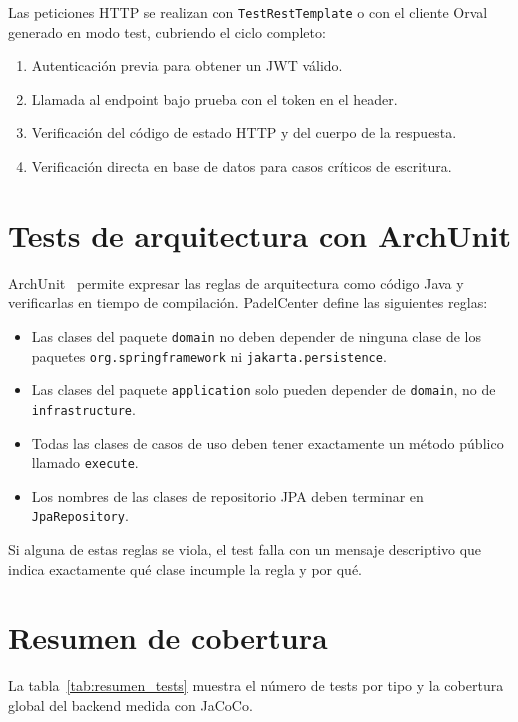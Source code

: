 Las peticiones HTTP se realizan con \texttt{TestRestTemplate} o con el cliente
Orval generado en modo test, cubriendo el ciclo completo:

\begin{enumerate}
  \item Autenticación previa para obtener un JWT válido.
  \item Llamada al endpoint bajo prueba con el token en el header.
  \item Verificación del código de estado HTTP y del cuerpo de la respuesta.
  \item Verificación directa en base de datos para casos críticos de escritura.
\end{enumerate}

\section{Tests de arquitectura con ArchUnit}
\label{sec:tests_arquitectura}

ArchUnit~\cite{archunit} permite expresar las reglas de arquitectura como código Java y
verificarlas en tiempo de compilación. PadelCenter define las siguientes reglas:

\begin{itemize}
  \item Las clases del paquete \texttt{domain} no deben depender de ninguna
    clase de los paquetes \texttt{org.springframework} ni
    \texttt{jakarta.persistence}.
  \item Las clases del paquete \texttt{application} solo pueden depender de
    \texttt{domain}, no de \texttt{infrastructure}.
  \item Todas las clases de casos de uso deben tener exactamente un método
    público llamado \texttt{execute}.
  \item Los nombres de las clases de repositorio JPA deben terminar en
    \texttt{JpaRepository}.
\end{itemize}

Si alguna de estas reglas se viola, el test falla con un mensaje descriptivo que
indica exactamente qué clase incumple la regla y por qué.

\section{Resumen de cobertura}
\label{sec:resumen_cobertura}

La tabla~\ref{tab:resumen_tests} muestra el número de tests por tipo y la
cobertura global del backend medida con JaCoCo.

